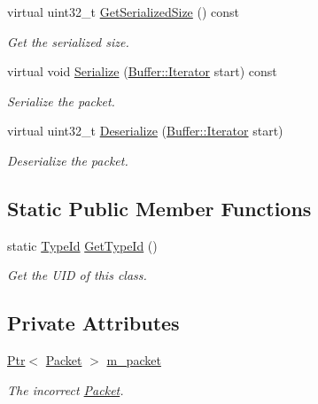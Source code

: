 \begin{DoxyCompactItemize}
virtual uint32\+\_\+t \hyperlink{classns3_1_1Icmpv6DestinationUnreachable_a34febc39220dc95c6b4e5fe3feb3f9c7}{Get\+Serialized\+Size} () const 
\begin{DoxyCompactList}\small\item\em Get the serialized size. \end{DoxyCompactList}\item 
virtual void \hyperlink{classns3_1_1Icmpv6DestinationUnreachable_a97ea83de54f105a43a8386e2934fe732}{Serialize} (\hyperlink{classns3_1_1Buffer_1_1Iterator}{Buffer\+::\+Iterator} start) const 
\begin{DoxyCompactList}\small\item\em Serialize the packet. \end{DoxyCompactList}\item 
virtual uint32\+\_\+t \hyperlink{classns3_1_1Icmpv6DestinationUnreachable_aab4cce60f9e44ae3bdca60d7157c1cd1}{Deserialize} (\hyperlink{classns3_1_1Buffer_1_1Iterator}{Buffer\+::\+Iterator} start)
\begin{DoxyCompactList}\small\item\em Deserialize the packet. \end{DoxyCompactList}\end{DoxyCompactItemize}
\subsection*{Static Public Member Functions}
\begin{DoxyCompactItemize}
\item 
static \hyperlink{classns3_1_1TypeId}{Type\+Id} \hyperlink{classns3_1_1Icmpv6DestinationUnreachable_a90f1732d63fdf1b1e31207218f49905a}{Get\+Type\+Id} ()
\begin{DoxyCompactList}\small\item\em Get the U\+ID of this class. \end{DoxyCompactList}\end{DoxyCompactItemize}
\subsection*{Private Attributes}
\begin{DoxyCompactItemize}
\item 
\hyperlink{classns3_1_1Ptr}{Ptr}$<$ \hyperlink{classns3_1_1Packet}{Packet} $>$ \hyperlink{classns3_1_1Icmpv6DestinationUnreachable_a7d95d00df1bcc03ae819a9d9252e43ac}{m\+\_\+packet}
\begin{DoxyCompactList}\small\item\em The incorrect \hyperlink{classns3_1_1Packet}{Packet}. \end{DoxyCompactList}\end{DoxyCompactItemize}
